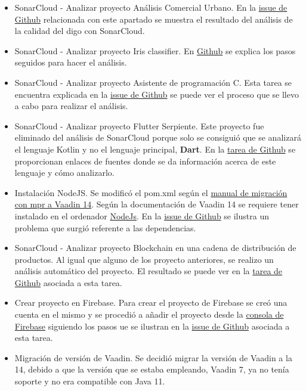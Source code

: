 \begin{itemize}
	\item SonarCloud - Analizar proyecto Análisis Comercial Urbano. 
		En la \href{https://github.com/dbo1001/Gestor-TFG-2021/issues/86}{issue de Github} relacionada con este apartado se muestra el resultado del análisis de la calidad del digo con SonarCloud.
	\item SonarCloud - Analizar proyecto Iris classifier. 
		En \href{https://github.com/dbo1001/Gestor-TFG-2021/issues/92}{Github} se explica los pasos seguidos para hacer el análisis.
	\item SonarCloud - Analizar proyecto Asistente de programación C. 
		Esta tarea se encuentra explicada en la \href{https://github.com/dbo1001/Gestor-TFG-2021/issues/88}{issue de Github} se puede ver el proceso que se llevo a cabo para realizar el análisis.
	\item SonarCloud - Analizar proyecto Flutter Serpiente. 
		Este proyecto fue eliminado del análisis de SonarCloud porque solo se consiguió que se analizará el lenguaje Kotlin y no el lenguaje principal, \textbf{Dart}. En la \href{https://github.com/dbo1001/Gestor-TFG-2021/issues/89}{tarea de Github} se proporcionan enlaces de fuentes donde se da información acerca de este lenguaje y cómo analizarlo. 
	\item Instalación NodeJS. 
		Se modificó el pom.xml según el \href{https://vaadin.com/docs/v10/mpr/introduction/step-1-migration-guide}{manual de migración con mpr a Vaadin 14}. Según la documentación de Vaadin 14 se requiere tener instalado en el ordenador \href{https://nodejs.org/en/download/}{NodeJs}. En la \href{https://github.com/dbo1001/Gestor-TFG-2021/issues/97}{issue de Github} se ilustra un problema que surgió referente a las dependencias. 
	\item SonarCloud - Analizar proyecto Blockchain en una cadena de distribución de productos. 
		Al igual que alguno de los proyecto anteriores, se realizo un análisis automático del proyecto. El resultado se puede ver en la \href{https://github.com/dbo1001/Gestor-TFG-2021/issues/87}{tarea de Github} asociada a esta tarea.
	\item Crear proyecto en Firebase. 
		Para crear el proyecto de Firebase se creó una cuenta en el mismo y se procedió a añadir el proyecto desde la \href{https://console.firebase.google.com/?pli=1}{consola de Firebase} siguiendo los pasos ue se ilustran en la \href{https://github.com/dbo1001/Gestor-TFG-2021/issues/98}{issue de Github} asociada a esta tarea.
	\item Migración de versión de Vaadin. 
		Se decidió migrar la versión de Vaadin a la 14, debido a que la versión que se estaba empleando, Vaadin 7, ya no tenía soporte y no era compatible con Java 11. 
		

\end{itemize}
